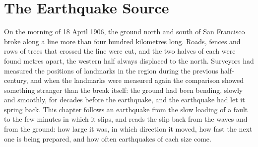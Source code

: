 \chapter{The Earthquake Source}\label{ch:b1:earthquake-source}

On the morning of 18 April 1906, the ground north and south of San Francisco
broke along a line more than four hundred kilometres long. Roads, fences and
rows of trees that crossed the line were cut, and the two halves of each were
found metres apart, the western half always displaced to the north. Surveyors
had measured the positions of landmarks in the region during the previous
half-century, and when the landmarks were measured again the
comparison showed something stranger than the break itself: the ground had
been bending, slowly and smoothly, for decades before the earthquake, and the
earthquake had let it spring back. This chapter follows an earthquake from
the slow loading of a fault to the few minutes in which it slips, and reads
the slip back from the waves and from the ground: how large it was, in which
direction it moved, how fast the next one is being prepared, and how often
earthquakes of each size come.

